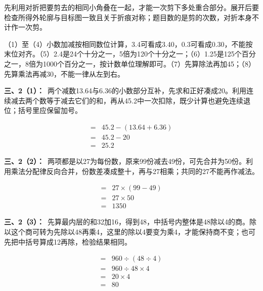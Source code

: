 \documentclass[multi=snippet,border=0pt]{standalone}
\newenvironment{snippet}[3]{\begin{minipage}{#1bp}\color{answerred}\fontsize{#2}{#3}\selectfont\raggedright}{\end{minipage}}
\begin{document}
\begin{snippet}{505}{11.5}{14}先利用对折把要剪去的相同小角叠在一起，才能一次剪下多处重合部分。展开后要检查所得外轮廓与目标图一致且关于折痕对称；题目数的是剪的次数，对折本身不计作一次剪。\end{snippet}
\begin{snippet}{505}{11.5}{14}（1）至（4）小数加减按相同数位计算，3.4可看成3.40，0.3可看成0.30，不能按末位对齐。（5）2.4是24个十分之一，5倍为120个十分之一；（6）1.25是125个百分之一，8倍为1000个百分之一，按计数单位理解即可。（7）先算除法再加45；（8）先算乘法再减30，不能一律从左到右。\end{snippet}
\begin{snippet}{505}{11.5}{14}\textbf{三、2（1）：}\ 两个减数13.64与6.36的小数部分互补，先求和正好凑成20。利用连续减去两个数等于减去它们的和，再从45.2中一次扣除，既少计算也避免连续退位；括号里应保留加号。\end{snippet}
\begin{snippet}{166.9}{10.5}{12.8}\[\begin{aligned}={}&45.2-(13.64+6.36)\\={}&45.2-20\\={}&25.2\end{aligned}\]\end{snippet}
\begin{snippet}{505}{11.5}{14}\textbf{三、2（2）：}\ 两项都是以27为每份数，原来99份减去49份，可先合并为50份。利用乘法分配律反向合并，份数差凑成整十，再与27相乘；共同的27不能再作减法。\end{snippet}
\begin{snippet}{163.9}{10.5}{12.8}\[\begin{aligned}={}&27\times(99-49)\\={}&27\times50\\={}&1350\end{aligned}\]\end{snippet}
\begin{snippet}{505}{11.5}{14}\textbf{三、2（3）：}\ 先算最内层的和32加16，得到48，中括号内整体是48除以4的商。除以这个商可转为先除以48再乘4，这里的除以4要变为乘4，才能保持商不变；也可先把中括号算成12再除，检验结果相同。\end{snippet}
\begin{snippet}{192.233}{10.5}{12.8}\[\begin{aligned}={}&960\div(48\div4)\\={}&960\div48\times4\\={}&20\times4\\={}&80\end{aligned}\]\end{snippet}
\end{document}
